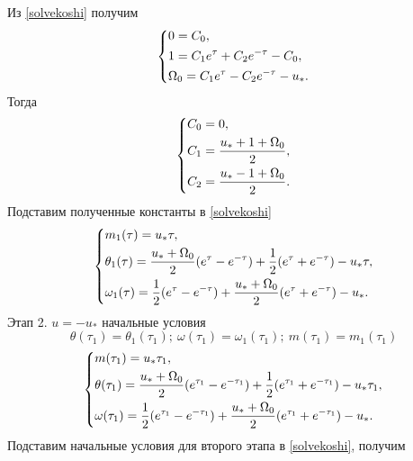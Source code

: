 \documentclass[a4paper,14pt]{article}
\theoremstyle{plain} %
\theoremstyle{definition} %
\theoremstyle{remark} %
\begin{document}
{Из \eqref{solvekoshi} получим
\begin{equation}\label{stage11}
    \left\{ {\begin{aligned}
                 & 0 = C_0, \hfill                                 \\
                 & 1 = C_1e^\tau+C_2e^{-\tau}-C_0 , \hfill         \\
                 & \Omega_0 = C_1e^\tau-C_2e^{-\tau}-u_*  . \hfill \\
            \end{aligned}} \right.
\end{equation}
Тогда
\begin{equation}\label{stage1Consts}
    \left\{ {\begin{aligned}
                 & C_0 = 0, \hfill                         \\
                 & C_1 = \frac{u_*+1+\Omega_0}{2}, \hfill  \\
                 & C_2 = \frac{u_*-1+\Omega_0}{2} . \hfill \\
            \end{aligned}} \right.
\end{equation}
Подставим полученные константы в \eqref{solvekoshi}
\begin{equation}\label{solvefull1stage}
    \left\{ {\begin{aligned}
                 & m_1(\tau) = u_*\tau, \hfill                                                                              \\
                 & \theta_1(\tau) = \frac{u_*+\Omega_0}{2}(e^\tau-e^{-\tau})+\frac{1}{2}(e^\tau+e^{-\tau})-u_*\tau , \hfill \\
                 & \omega_1(\tau) = \frac{1}{2}(e^\tau-e^{-\tau})+\frac{u_*+\Omega_0}{2}(e^\tau+e^{-\tau})-u_*  . \hfill    \\
            \end{aligned}} \right.
\end{equation}
Этап 2. $u=-u_*$ начальные условия
\[
    \theta(\tau_1)=\theta_1(\tau_1);\ \omega(\tau_1)=\omega_1(\tau_1);\ m(\tau_1)=m_1(\tau_1)
\]
\begin{equation}\label{basecond2stage}
    \left\{ {\begin{aligned}
                 & m(\tau_1) = u_*\tau_1, \hfill                                                                                          \\
                 & \theta(\tau_1) = \frac{u_*+\Omega_0}{2}(e^{\tau_1}-e^{-\tau_1})+\frac{1}{2}(e^{\tau_1}+e^{-\tau_1})-u_*\tau_1 , \hfill \\
                 & \omega(\tau_1) = \frac{1}{2}(e^{\tau_1}-e^{-\tau_1})+\frac{u_*+\Omega_0}{2}(e^{\tau_1}+e^{-\tau_1})-u_*  . \hfill      \\
            \end{aligned}} \right.
\end{equation}
Подставим начальные условия для второго этапа в \eqref{solvekoshi}, получим

}
\end{document}
